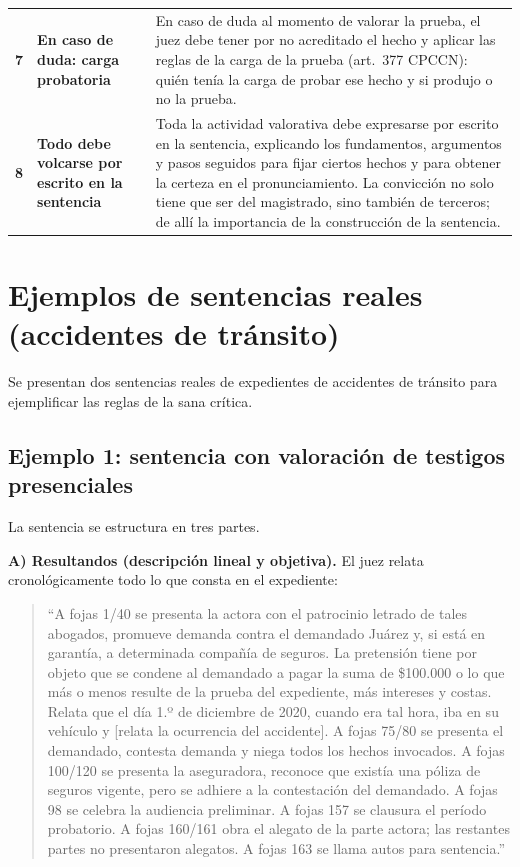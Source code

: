 \documentclass[12pt,oneside]{book}
\begin{document}
\begin{longtable}{>{\raggedright\arraybackslash}p{1.6cm} >{\raggedright\arraybackslash}p{3.8cm} >{\raggedright\arraybackslash}p{7.6cm}}
\addlinespace
\textbf{7} & \textbf{En caso de duda: carga probatoria} & En caso de duda al momento de valorar la prueba, el juez debe tener por no acreditado el hecho y aplicar las reglas de la carga de la prueba (art.~377 CPCCN): quién tenía la carga de probar ese hecho y si produjo o no la prueba. \\
\addlinespace
\textbf{8} & \textbf{Todo debe volcarse por escrito en la sentencia} & Toda la actividad valorativa debe expresarse por escrito en la sentencia, explicando los fundamentos, argumentos y pasos seguidos para fijar ciertos hechos y para obtener la certeza en el pronunciamiento. La convicción no solo tiene que ser del magistrado, sino también de terceros; de allí la importancia de la construcción de la sentencia. \\
\bottomrule
\end{longtable}

\section{Ejemplos de sentencias reales (accidentes de tránsito)}

Se presentan dos sentencias reales de expedientes de accidentes de tránsito para ejemplificar las reglas de la sana crítica.

\subsection{Ejemplo 1: sentencia con valoración de testigos presenciales}

La sentencia se estructura en tres partes.

\textbf{A) Resultandos (descripción lineal y objetiva).} El juez relata cronológicamente todo lo que consta en el expediente:

\begin{quote}
``A fojas 1/40 se presenta la actora con el patrocinio letrado de tales abogados, promueve demanda contra el demandado Juárez y, si está en garantía, a determinada compañía de seguros. La pretensión tiene por objeto que se condene al demandado a pagar la suma de \$100.000 o lo que más o menos resulte de la prueba del expediente, más intereses y costas. Relata que el día 1.º de diciembre de 2020, cuando era tal hora, iba en su vehículo y [relata la ocurrencia del accidente]. A fojas 75/80 se presenta el demandado, contesta demanda y niega todos los hechos invocados. A fojas 100/120 se presenta la aseguradora, reconoce que existía una póliza de seguros vigente, pero se adhiere a la contestación del demandado. A fojas 98 se celebra la audiencia preliminar. A fojas 157 se clausura el período probatorio. A fojas 160/161 obra el alegato de la parte actora; las restantes partes no presentaron alegatos. A fojas 163 se llama autos para sentencia.''
\end{quote}
\end{document}
